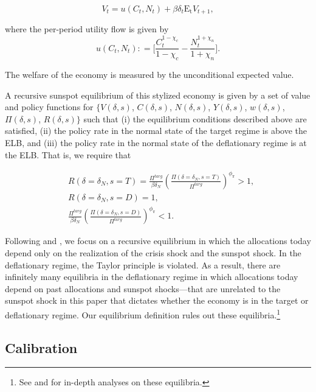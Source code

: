 \documentclass[11pt]{article}
\begin{document}
	\begin{equation}
		V_{t} = u(C_{t},N_{t}) + \beta \delta_{t}\mathrm{E_{t}}V_{t+1},
	\end{equation}
	
	\noindent where the per-period utility flow is given by
	\begin{equation}
		u(C_{t},N_{t}) : = \Bigg[\frac{C_{t}^{1-\chi_{c}}}{1-\chi_{c}}-\frac{N_{t}^{1+\chi_{n}}}{1+\chi_{n}}\Bigg]. 
	\end{equation}
	
	\noindent The welfare of the economy is measured by the unconditional expected value.
	
	A recursive sunspot equilibrium of this stylized economy is given by a set of value and policy functions for $\{V(\delta,s)$, $C(\delta,s)$, $N(\delta,s)$, $Y(\delta,s)$, $w(\delta,s)$, $\Pi(\delta,s)$, $R(\delta,s)\}$ such that (i) the equilibrium conditions described above are satisfied, (ii) the policy rate in the normal state of the target regime is above the ELB, and (iii) the policy rate in the normal state of the deflationary regime is at the ELB. That is, we require that 
	
	\begin{align}
		& R(\delta=\delta_{N},s=T) = \frac{\Pi^{targ}}{\beta\delta_N}\left(\frac{\Pi(\delta=\delta_{N},s=T)}{\Pi^{targ}}\right)^{\phi_{\pi}} > 1,\\
		& R(\delta=\delta_{N},s=D) = 1,\\
		& \frac{\Pi^{targ}}{\beta\delta_N}\left(\frac{\Pi(\delta=\delta_{N},s=D)}{\Pi^{targ}}\right)^{\phi_{\pi}} < 1.
	\end{align}
	
	Following \citet{MertensRavn2014} and \citet{AruobaCubaBordaSchorfheide2018}, we focus on a recursive equilibrium in which the allocations today depend only on the realization of the crisis shock and the sunspot shock. In the deflationary regime, the Taylor principle is violated. As a result, there are infinitely many equilibria in the deflationary regime in which allocations today depend on past allocations and sunspot shocks---that are unrelated to the sunspot shock in this paper that dictates whether the economy is in the target or deflationary regime. Our equilibrium definition rules out these equilibria.\footnote{See \citet{Hirose2007} and \citet{HiroseForthcoming} for in-depth analyses on these equilibria.}
	
	
	\subsection{Calibration}
	\label{S:Calibration}
	
\end{document}
